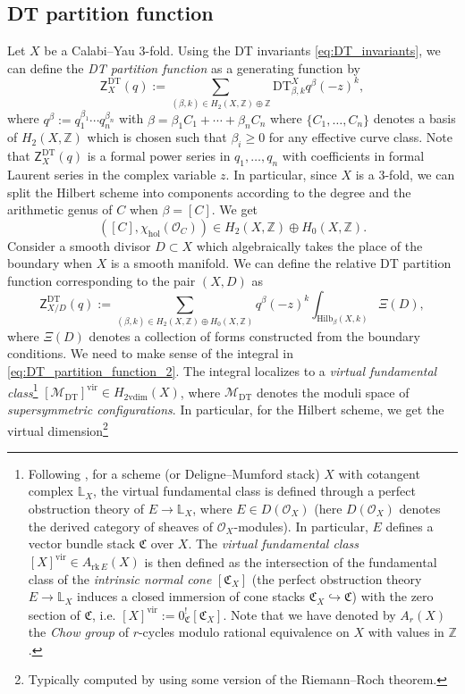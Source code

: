 \documentclass[11pt,colorinlistoftodos]{amsart}
\numberwithin{equation}{subsection}
\theoremstyle{plain}
\theoremstyle{definition}
\theoremstyle{remark}
\newcommand{\Z}{\mathbb{Z}}
\newcommand{\calO}{\mathcal{O}}
\newcommand{\calM}{\mathcal{M}}
\begin{document}
\subsection{DT partition function}
\label{subsec:DT_partition_function}
Let $X$ be a Calabi--Yau 3-fold. Using the DT invariants \eqref{eq:DT_invariants}, we can define the \emph{DT partition function} as a generating function by 
\begin{equation}
\label{eq:DT_partition)_function_1}
\mathsf{Z}^\mathrm{DT}_X(q):=\sum_{(\beta,k)\in H_2(X,\mathbb{Z})\oplus\Z}\mathrm{DT}_{\beta,k}^Xq^\beta(-z)^k,
\end{equation}
where $q^\beta:=q_1^{\beta_1}\dotsm q_n^{\beta_n}$ with $\beta=\beta_1C_1+\dotsm +\beta_nC_n$ where $\{C_1,\ldots,C_n\}$ denotes a basis of $H_2(X,\Z)$ which is chosen such that $\beta_i\geq 0$ for any effective curve class. Note that $\mathsf{Z}^\mathrm{DT}_X(q)$ is a formal power series in $q_1,\ldots,q_n$ with coefficients in formal Laurent series in the complex variable $z$. In particular, since $X$ is a 3-fold, we can split the Hilbert scheme into components according to the degree and the arithmetic genus of $C$ when $\beta=[C]$. We get
\[
([C],\chi_\mathrm{hol}(\mathcal{O}_C))\in H_2(X,\Z)\oplus H_0(X,\Z).
\]
Consider a smooth divisor $D\subset X$ which algebraically takes the place of the boundary when $X$ is a smooth manifold. We can define the relative DT partition function corresponding to the pair $(X,D)$ as 
\begin{equation}
\label{eq:DT_partition_function_2}
\mathsf{Z}^\mathrm{DT}_{X/D}(q):=\sum_{(\beta,k)\in H_2(X,\mathbb{Z})\oplus H_0(X,\Z)}q^\beta(-z)^k\int_{\mathrm{Hilb}_{\beta}(X,k)}\Xi(D),
\end{equation}
where $\Xi(D)$ denotes a collection of forms constructed from the boundary conditions. We need to make sense of the integral in \eqref{eq:DT_partition_function_2}.
The integral localizes to a \emph{virtual fundamental class}\footnote{\label{foot:virtual_fundamental_class}Following \cite{Behrend2009}, for a scheme (or Deligne--Mumford stack) $X$ with cotangent complex $\mathbb{L}_X$, the virtual fundamental class is defined through a perfect obstruction theory of $E\to \mathbb{L}_X$, where $E\in D(\calO_X)$ (here $D(\calO_X)$ denotes the derived category of sheaves of $\calO_X$-modules). In particular, $E$ defines a vector bundle stack $\mathfrak{C}$ over $X$. The \emph{virtual fundamental class} $[X]^\mathrm{vir}\in A_{\mathrm{rk}\,E}(X)$ is then defined as the intersection of the fundamental class of the \emph{intrinsic normal cone} $[\mathfrak{C}_X]$ (the perfect obstruction theory $E\to\mathbb{L}_X$ induces a closed immersion of cone stacks $\mathfrak{C}_X\hookrightarrow\mathfrak{C}$) with the zero section of $\mathfrak{C}$, i.e. $[X]^\mathrm{vir}:=0^!_{\mathfrak{C}}[\mathfrak{C}_X]$. Note that we have denoted by $A_r(X)$ the \emph{Chow group} of $r$-cycles modulo rational equivalence on $X$ with values in $\Z$.} $[\calM_\mathrm{DT}]^\mathrm{vir}\in H_{2\mathrm{vdim}}(X)$, where $\calM_\mathrm{DT}$ denotes the moduli space of \emph{supersymmetric configurations}. In particular, for the Hilbert scheme, we get the virtual dimension\footnote{Typically computed by using some version of the Riemann--Roch theorem.}
\end{document}
